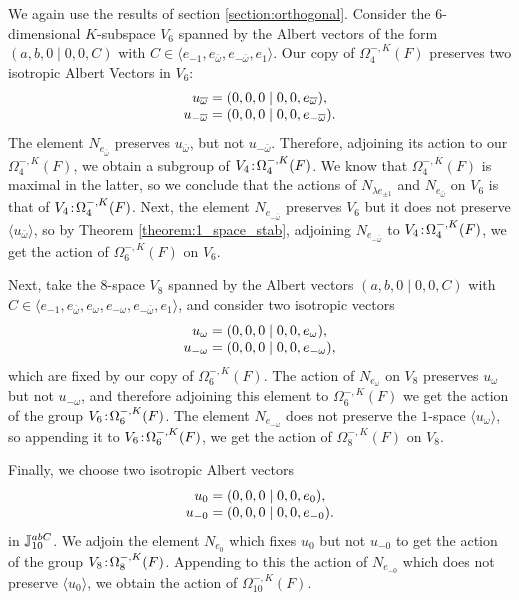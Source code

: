 We again use the results of section \ref{section:orthogonal}. Consider the $6$-dimensional
$K$-subspace $V_6$ spanned by the Albert vectors of the form 
$(a,b,0\mid 0,0,C)$ with $C \in \langle e_{-1}, e_{\bar{\omega}}, e_{-\bar{\omega}}, e_1 \rangle$.
Our copy of $\Omega_4^{-,K}(F)$ preserves two isotropic Albert Vectors in $V_6$: 
\begin{equation}
	\begin{array}{r@{\;}c@{\;}l}
		u_{\bar{\omega}} & = & (0,0,0\mid 0,0,e_{\bar{\omega}}), \\
		u_{-\bar{\omega}} & = & (0,0,0\mid 0,0,e_{-\bar{\omega}}). \\
	\end{array} 
\end{equation}
The element $N_{e_{\bar{\omega}}}$ preserves $u_{\bar{\omega}}$, but not $u_{-\bar{\omega}}$. 
Therefore, adjoining its action to our $\Omega_4^{-,K}(F)$, we obtain a subgroup of 
$V_4\mathord{{\;\!{:}\;\!}}\Omega_4^{-,K}(F)$. We know that $\Omega_4^{-,K}(F)$ is maximal in the latter, so 
we conclude that the actions of $N_{\lambda e_{\pm 1}}$ and $N_{e_{\bar{\omega}}}$ on 
$V_6$ is that of $V_4\mathord{{\;\!{:}\;\!}}\Omega_4^{-,K}(F)$. Next, the element $N_{e_{-\bar{\omega}}}$
preserves $V_6$ but it does not preserve $\langle u_{\bar{\omega}} \rangle$, so by Theorem
\ref{theorem:1_space_stab}, adjoining $N_{e_{-\bar{\omega}}}$ to $V_4\mathord{{\;\!{:}\;\!}}\Omega_4^{-,K}(F)$,
we get the action of $\Omega_6^{-,K}(F)$ on $V_6$.

Next, take the $8$-space $V_8$ spanned by the Albert vectors $(a,b,0\mid 0,0,C)$ with 
$C \in \langle e_{-1}, e_{\bar{\omega}}, e_{\omega}, 
e_{- \omega}, e_{-\bar{\omega}}, e_1 \rangle$, and consider two isotropic vectors
\begin{equation}
	\begin{array}{r@{\;}c@{\;}l}
		u_{\omega} & = & (0,0,0 \mid 0,0,e_{\omega}), \\
		u_{-\omega} & = & (0,0,0 \mid 0,0,e_{-\omega}),
	\end{array}
\end{equation}
which are fixed by our copy of $\Omega_6^{-,K}(F)$. The action of $N_{e_{\omega}}$ on $V_8$
preserves $u_{\omega}$ but not $u_{-\omega}$, and therefore adjoining this element to 
$\Omega_6^{-,K}(F)$ we get the action of the group $V_6\mathord{{\;\!{:}\;\!}}\Omega_6^{-,K}(F)$. The element
$N_{e_{-\omega}}$ does not preserve the $1$-space $\langle u_{\omega} \rangle$, so appending it to 
$V_6\mathord{{\;\!{:}\;\!}}\Omega_6^{-,K}(F)$, we get the action of $\Omega_8^{-,K}(F)$ on $V_8$. 

Finally, we choose two isotropic Albert vectors
\begin{equation}
	\begin{array}{r@{\;}c@{\;}l}
		u_0 & = & (0,0,0\mid 0,0,e_0), \\
		u_{-0} & = & (0,0,0\mid 0,0,e_{-0}).
	\end{array}
\end{equation}
in $\mathbb{J}_{10}^{abC}$. We adjoin the element $N_{e_{0}}$ which fixes $u_0$ but not $u_{-0}$ to 
get the action of the group $V_8\mathord{{\;\!{:}\;\!}} \Omega_8^{-,K}(F)$. Appending to this the action of
$N_{e_{-0}}$ which does not preserve $\langle u_0 \rangle$, we obtain the action of
$\Omega_{10}^{-,K}(F)$.

